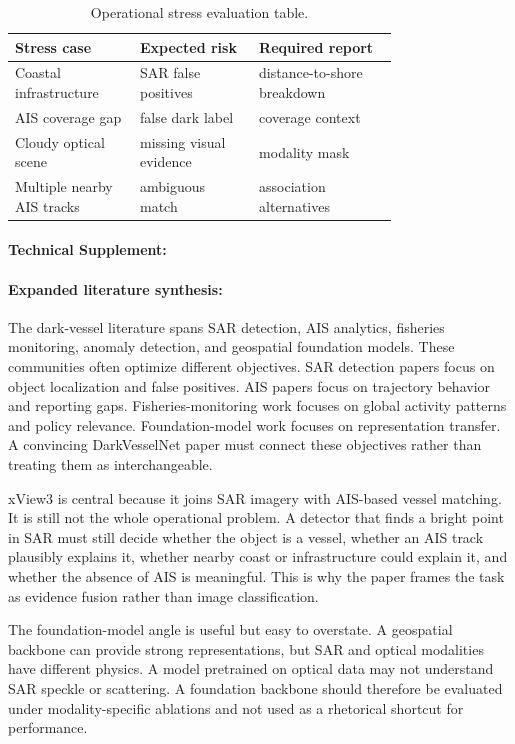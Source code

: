 \documentclass{article}
\begin{document}
\begin{table}[t]
\centering
\caption{Operational stress evaluation table.}
\begin{tabular}{@{}p{0.24\linewidth}p{0.24\linewidth}p{0.28\linewidth}@{}}
\toprule
\textbf{Stress case} & \textbf{Expected risk} & \textbf{Required report}\\
\midrule
Coastal infrastructure & SAR false positives & distance-to-shore breakdown\\
AIS coverage gap & false dark label & coverage context\\
Cloudy optical scene & missing visual evidence & modality mask\\
Multiple nearby AIS tracks & ambiguous match & association alternatives\\
\bottomrule
\end{tabular}
\end{table}

\paragraph{Technical Supplement:}

\paragraph{Expanded literature synthesis:}

The dark-vessel literature spans SAR detection, AIS analytics, fisheries monitoring, anomaly detection, and geospatial foundation models. These communities often optimize different objectives. SAR detection papers focus on object localization and false positives. AIS papers focus on trajectory behavior and reporting gaps. Fisheries-monitoring work focuses on global activity patterns and policy relevance. Foundation-model work focuses on representation transfer. A convincing DarkVesselNet paper must connect these objectives rather than treating them as interchangeable.

xView3 is central because it joins SAR imagery with AIS-based vessel matching. It is still not the whole operational problem. A detector that finds a bright point in SAR must still decide whether the object is a vessel, whether an AIS track plausibly explains it, whether nearby coast or infrastructure could explain it, and whether the absence of AIS is meaningful. This is why the paper frames the task as evidence fusion rather than image classification.

The foundation-model angle is useful but easy to overstate. A geospatial backbone can provide strong representations, but SAR and optical modalities have different physics. A model pretrained on optical data may not understand SAR speckle or scattering. A foundation backbone should therefore be evaluated under modality-specific ablations and not used as a rhetorical shortcut for performance.
\end{document}
